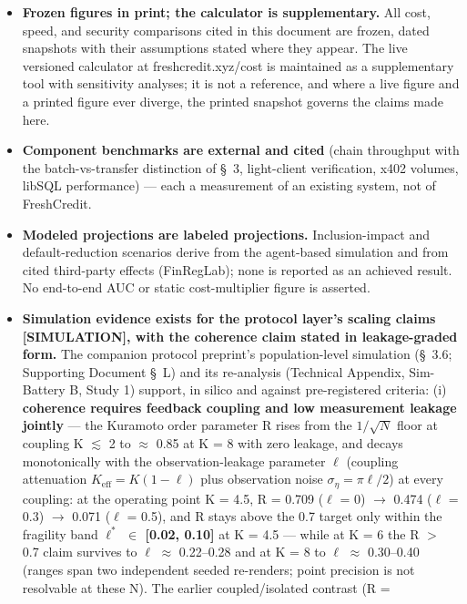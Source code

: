 \documentclass[
]{article}
\newcounter{none} %
\begin{document}
\begin{itemize}
\item
  \textbf{Frozen figures in print; the calculator is supplementary.} All
  cost, speed, and security comparisons cited in this document are
  frozen, dated snapshots with their assumptions stated where they
  appear. The live versioned calculator at freshcredit.xyz/cost is
  maintained as a supplementary tool with sensitivity analyses; it is
  not a reference, and where a live figure and a printed figure ever
  diverge, the printed snapshot governs the claims made here.
\item
  \textbf{Component benchmarks are external and cited} (chain throughput
  with the batch-vs-transfer distinction of §~3, light-client
  verification, x402 volumes, libSQL performance) --- each a measurement
  of an existing system, not of FreshCredit.
\item
  \textbf{Modeled projections are labeled projections.} Inclusion-impact
  and default-reduction scenarios derive from the agent-based simulation
  and from cited third-party effects (FinRegLab); none is reported as an
  achieved result. No end-to-end AUC or static cost-multiplier figure is
  asserted.
\item
  \textbf{Simulation evidence exists for the protocol layer's scaling
  claims {[}SIMULATION{]}, with the coherence claim stated in
  leakage-graded form.} The companion protocol preprint's
  population-level simulation (§~3.6; Supporting Document §~L) and its
  re-analysis (Technical Appendix, Sim-Battery B, Study 1) support, in
  silico and against pre-registered criteria: (i) \textbf{coherence
  requires feedback coupling and low measurement leakage jointly} ---
  the Kuramoto order parameter R rises from the \(1/\sqrt{N}\) floor at
  coupling K \(\lesssim\) 2 to \(\approx\) 0.85 at K = 8 with zero
  leakage, and decays monotonically with the observation-leakage
  parameter \(\ell\) (coupling attenuation
  \(K_{\mathrm{eff}} = K(1-\ell)\) plus observation noise
  \(\sigma_{\eta} = \pi\ell/2\)) at every coupling: at the operating
  point K = 4.5, R = 0.709 (\(\ell\) = 0) \(\rightarrow\) 0.474
  (\(\ell\) = 0.3) \(\rightarrow\) 0.071 (\(\ell\) = 0.5), and R stays
  above the 0.7 target only within the fragility band
  \textbf{\(\ell^{*}\) \(\in\) {[}0.02, 0.10{]}} at K = 4.5 --- while at
  K = 6 the R \(>\) 0.7 claim survives to \(\ell\) \(\approx\)
  0.22--0.28 and at K = 8 to \(\ell\) \(\approx\) 0.30--0.40 (ranges
  span two independent seeded re-renders; point precision is not
  resolvable at these N). The earlier coupled/isolated contrast (R =

\end{itemize}
\end{document}

